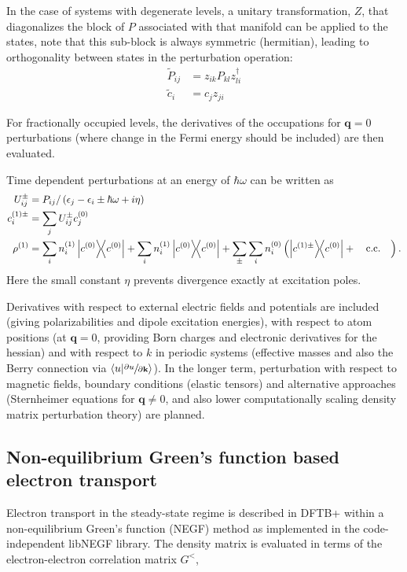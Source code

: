 \documentclass[reprint,onecolumn,superscriptaddress]{revtex4-1}
\newcommand{\dftbp}{DFTB+}
\begin{document}
In the case of systems with degenerate levels, a unitary transformation, $Z$, that
diagonalizes the block of $P$ associated with that manifold can be applied to
the states, note that this sub-block is always symmetric (hermitian), leading to
orthogonality between states in the perturbation operation:
\begin{align}
  \tilde{P}_{ij} &= z_{ik} P_{kl} z_{li}^\dag\\
  \tilde{c}_i &= c_j z_{ji}
\end{align}

For fractionally occupied levels, the derivatives of the occupations for
$\mathbf{q}=0$ perturbations (where change in the Fermi energy should be
included) are then evaluated.\cite{nishimoto2017317}

Time dependent perturbations at an energy of $\hbar \omega$ can be written as
\begin{align}
  U_{ij}^\pm &= P_{ij} / \left( \epsilon_j - \epsilon_i \pm \hbar \omega + i\eta
               \right)\\
  c_i^{(1)\pm} &= \sum_j U_{ij}^\pm c_j^{(0)}\\
  \rho^{(1)} &= \sum_i n^{(1)}_i \dyad{c^{(0)}} + \sum_i n^{(1)}_i \dyad{c^{(0)}}
               + \sum_\pm \sum_i n^{(0)}_i \left( \dyad{c^{(1)\pm}}{c^{(0)}} + \qcc \right).
\end{align}
Here the small constant $\eta$ prevents divergence exactly at excitation
poles.

Derivatives with respect to external electric fields and potentials are included
(giving polarizabilities and dipole excitation energies), with respect to atom
positions (at $\mathbf{q}=0$, providing Born charges and electronic derivatives
for the hessian) and with respect to $k$ in periodic systems (effective masses
and also the Berry connection via $\braket{u}{\sfrac{\partial u}{\partial
    \mathbf{k}}}$). In the longer term, perturbation with respect to magnetic
fields, boundary conditions (elastic tensors) and alternative approaches
(Sternheimer equations for $\mathbf{q}\ne0$, and also lower computationally scaling
density matrix perturbation theory) are planned.

\subsection{Non-equilibrium Green's function based electron transport}

Electron transport in the steady-state regime is described in \dftbp{} within a
non-equilibrium Green's function (NEGF) method \cite{pecchia2004, haug2008} as
implemented in the code-independent libNEGF\cite{libnegf-repo} library.  The
density matrix is evaluated in terms of the electron-electron correlation matrix
$G^{<}$,\cite{haug2008}
\end{document}
